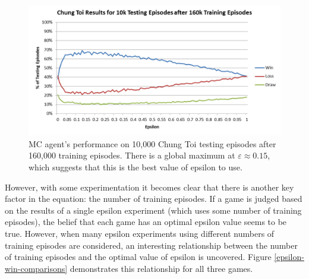 \documentclass[11pt,a4paper]{report}
\begin{document}
\begin{figure}[htbp]
	\begin{center}
		\includegraphics[width=\linewidth]{ChungToi_EpsilonResults_160kTrainingGames_10kTestingGames.png}
		\caption{MC agent's performance on 10,000 Chung Toi testing episodes after 160,000 training episodes. There is a global maximum at $\varepsilon \approx 0.15$, which suggests that this is the best value of epsilon to use.}
		\label{chung-toi-epsilon-160ktrain-10ktest}
	\end{center}
\end{figure}

However, with some experimentation it becomes clear that there is another key factor in the equation: the number of training episodes. If a game is judged based on the results of a single epsilon experiment (which uses some number of training episodes), the belief that each game has an optimal epsilon value seems to be true. However, when many epsilon experiments using different numbers of training episodes are considered, an interesting relationship between the number of training episodes and the optimal value of epsilon is uncovered. Figure \ref{epsilon-win-comparisons} demonstrates this relationship for all three games.
\end{document}
